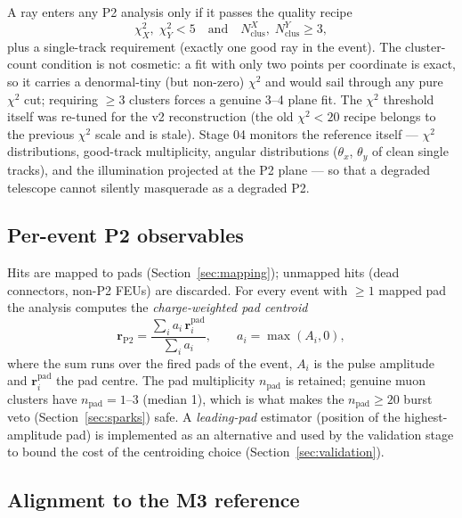 \documentclass[11pt,a4paper]{article}
\begin{document}
A ray enters any P2 analysis only if it passes the quality recipe
%
\begin{equation}
  \chi^2_X,\;\chi^2_Y < 5
  \quad\text{and}\quad
  N^X_\text{clus},\;N^Y_\text{clus} \ge 3 ,
  \label{eq:m3cut}
\end{equation}
%
plus a single-track requirement (exactly one good ray in the event). The
cluster-count condition is not cosmetic: a fit with only two points per
coordinate is exact, so it carries a denormal-tiny (but non-zero) $\chi^2$
and would sail through any pure $\chi^2$ cut; requiring $\ge 3$ clusters
forces a genuine 3--4 plane fit. The $\chi^2$ threshold itself was re-tuned
for the v2 reconstruction (the old $\chi^2<20$ recipe belongs to the previous
$\chi^2$ scale and is stale). Stage 04 monitors the reference itself ---
$\chi^2$ distributions, good-track multiplicity, angular distributions
($\theta_x$, $\theta_y$ of clean single tracks), and the illumination
projected at the P2 plane --- so that a degraded telescope cannot silently
masquerade as a degraded P2.

\subsection{Per-event P2 observables}
\label{sec:centroid}

Hits are mapped to pads (Section~\ref{sec:mapping}); unmapped hits (dead
connectors, non-P2 FEUs) are discarded. For every event with $\ge 1$ mapped
pad the analysis computes the \emph{charge-weighted pad centroid}
%
\begin{equation}
  \mathbf{r}_\text{P2}
  = \frac{\sum_i a_i\, \mathbf{r}^\text{pad}_i}{\sum_i a_i},
  \qquad a_i = \max(A_i, 0),
  \label{eq:centroid}
\end{equation}
%
where the sum runs over the fired pads of the event, $A_i$ is the pulse
amplitude and $\mathbf{r}^\text{pad}_i$ the pad centre. The pad multiplicity
$n_\text{pad}$ is retained; genuine muon clusters have
$n_\text{pad}=1\text{--}3$ (median 1), which is what makes the
$n_\text{pad}\ge 20$ burst veto (Section~\ref{sec:sparks}) safe. A
\emph{leading-pad} estimator (position of the highest-amplitude pad) is
implemented as an alternative and used by the validation stage to bound the
cost of the centroiding choice (Section~\ref{sec:validation}).

\subsection{Alignment to the M3 reference}
\label{sec:alignment}
\end{document}
